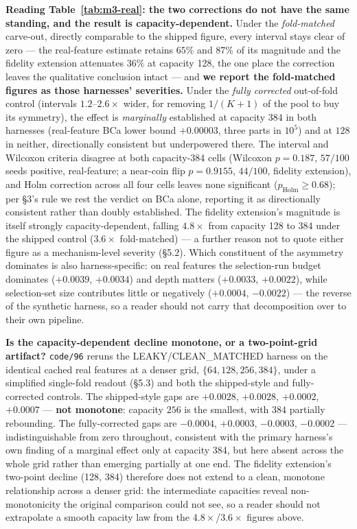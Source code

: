 \documentclass[10pt]{article} %
\begin{document}
\textbf{Reading Table~\ref{tab:m3-real}: the two corrections do not have the
same standing, and the result is capacity-dependent.} Under the
\emph{fold-matched} carve-out, directly comparable to the shipped figure,
every interval stays clear of zero --- the real-feature estimate retains
$65\%$ and $87\%$ of its magnitude and the fidelity extension attenuates
$36\%$ at capacity 128, the one place the correction leaves the qualitative
conclusion intact --- and \textbf{we report the fold-matched figures as those
harnesses' severities.} Under the \emph{fully corrected} out-of-fold control
(intervals $1.2$--$2.6\times$ wider, for removing $1/(K{+}1)$ of the pool to
buy its symmetry), the effect is \emph{marginally} established at capacity
$384$ in both harnesses (real-feature BCa lower bound $+0.00003$, three parts
in $10^5$) and at $128$ in neither, directionally consistent but underpowered
there. The interval and Wilcoxon criteria disagree at both capacity-384
cells (Wilcoxon $p=0.187$, $57/100$ seeds positive, real-feature; a near-coin
flip $p=0.9155$, $44/100$, fidelity extension), and Holm correction across
all four cells leaves none significant ($p_{\text{Holm}}\geq0.68$); per §3's
rule we rest the verdict on BCa alone, reporting it as directionally
consistent rather than doubly established. The fidelity extension's
magnitude is itself strongly capacity-dependent, falling $4.8\times$ from
capacity 128 to 384 under the shipped control ($3.6\times$ fold-matched) ---
a further reason not to quote either figure as a mechanism-level severity
(§5.2). Which constituent of the asymmetry dominates is also harness-specific:
on real features the selection-run budget dominates ($+0.0039$, $+0.0034$)
and depth matters ($+0.0033$, $+0.0022$), while selection-set size
contributes little or negatively ($+0.0004$, $-0.0022$) --- the reverse of
the synthetic harness, so a reader should not carry that decomposition over
to their own pipeline.

\textbf{Is the capacity-dependent decline monotone, or a two-point-grid
artifact?} \texttt{code/96} reruns the LEAKY/CLEAN\_MATCHED harness on the
identical cached real features at a denser grid, $\{64,128,256,384\}$, under
a simplified single-fold readout (§5.3) and both the shipped-style and
fully-corrected controls. The shipped-style gaps are $+0.0028$, $+0.0028$,
$+0.0002$, $+0.0007$ --- \textbf{not monotone}: capacity $256$ is the
smallest, with $384$ partially rebounding. The fully-corrected gaps are
$-0.0004$, $+0.0003$, $-0.0003$, $-0.0002$ --- indistinguishable from zero
throughout, consistent with the primary harness's own finding of a marginal
effect only at capacity 384, but here absent across the whole grid rather
than emerging partially at one end. The fidelity extension's two-point decline
(128, 384) therefore does not extend to a clean, monotone relationship across
a denser grid: the intermediate capacities reveal non-monotonicity the
original comparison could not see, so a reader should not extrapolate a
smooth capacity law from the $4.8\times$/$3.6\times$ figures above.
\end{document}
